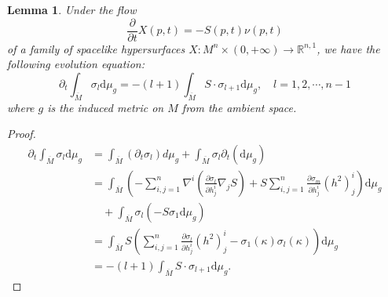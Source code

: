 \documentclass[reqno]{amsart}
\newtheorem{lemma}[theorem]{Lemma}
\theoremstyle{remark}
\newcommand{\dd}{\ensuremath{\text{d}}}
\newcommand{\R}{\ensuremath{\mathbb{R}}}
\newcommand{\pd}[2]{\frac{\partial {#1}}{\partial {#2}}}
\theoremstyle{definition}
\numberwithin{equation}{section}
\begin{document}
\begin{lemma}\label{eq:evolution_integral_sigma_l}
    Under the flow 
    \begin{equation}\label{eq:inverse_sigma_k_flow}
        \pd{}{t}X(p,t) = -S(p,t)\nu(p,t)
    \end{equation}
    of a family of spacelike hypersurfaces \(X : M^n\times (0,+\infty) \to \R^{n,1}\), we have the following evolution equation: 
    \begin{equation}
        \partial_t \int_{\overline{M}} \sigma_l \dd \mu_g = -(l+1)\int_{\overline{M}} S\cdot \sigma_{l+1} \dd \mu_g,\quad l=1,2,\cdots,n-1
    \end{equation}
    where \(g\) is the induced metric on \(M\) from the ambient space. 
\end{lemma}
\begin{proof}
    \begin{equation}
        \begin{aligned}
            \partial_t \int_{\overline{M}} \sigma_l \dd \mu_g &= \int_{\overline{M}} (\partial_t \sigma_l) d\mu_g + \int_{\overline{M}} \sigma_l \partial_t(\dd \mu_g) \\
            &= \int_{\overline{M}} \left( -\sum_{i,j=1}^{n}\nabla^i \left(\pd{\sigma_l}{h_j^i}\nabla_j S\right) + S\sum_{i,j=1}^{n} \pd{\sigma_m}{h_j^i}(h^2)_j^i \right) \dd \mu_g \\
            &\quad + \int_{\overline{M}} \sigma_l(-S\sigma_1 \dd \mu_g) \\
            &= \int_{\overline{M}} S\left( \sum_{i,j=1}^{n} \pd{\sigma_l}{h_j^i}(h^2)_j^i - \sigma_1(\kappa)\sigma_l(\kappa) \right)\dd \mu_g \\
            &= -(l+1)\int_{\overline{M}} S\cdot \sigma_{l+1}\dd \mu_g.
        \end{aligned}
    \end{equation}
\end{proof}
\end{document}
